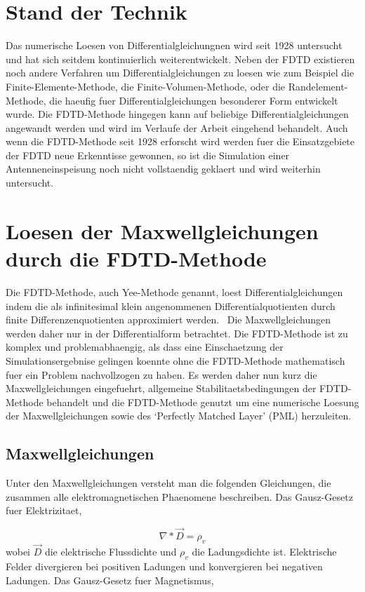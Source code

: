 \documentclass[11pt, ngerman]{article}
\begin{document}
\section{Stand der Technik}
Das numerische Loesen von Differentialgleichungnen wird seit 1928 untersucht
\cite{fdtd_u} und hat sich seitdem kontinuierlich weiterentwickelt.\cite{fdtd_history}
Neben der FDTD existieren noch andere Verfahren um Differentialgleichungen
zu loesen wie zum Beispiel die Finite-Elemente-Methode, die Finite-Volumen-Methode,
oder die Randelement-Methode, die haeufig fuer Differentialgleichungen
besonderer Form entwickelt wurde.\cite{mathepedia_numerische_verfahren} 
Die FDTD-Methode hingegen kann auf beliebige Differentialgleichungen angewandt
werden und wird im Verlaufe der Arbeit eingehend behandelt.
Auch wenn die FDTD-Methode seit 1928 erforscht wird werden fuer die Einsatzgebiete
der FDTD neue Erkenntisse gewonnen, so ist die Simulation einer Antenneneinspeisung
noch nicht vollstaendig geklaert und wird weiterhin untersucht.\cite{advanced_gap_feed}

\section{Loesen der Maxwellgleichungen durch die FDTD-Methode}
Die FDTD-Methode, auch Yee-Methode genannt, loest Differentialgleichungen
indem die als infinitesimal klein angenommenen Differentialquotienten
durch finite Differenzenquotienten approximiert werden.~\cite{fdtd_u}
Die Maxwellgleichungen werden daher nur in der Differentialform betrachtet.
Die FDTD-Methode ist zu komplex und problemabhaengig,
als dass eine Einschaetzung der Simulationsergebnise gelingen koennte ohne die FDTD-Methode
mathematisch fuer ein Problem nachvollzogen zu haben.
Es werden daher nun kurz die Maxwellgleichungen eingefuehrt, allgemeine
Stabilitaetsbedingungen der FDTD-Methode behandelt und die FDTD-Methode
genutzt um eine numerische Loesung der Maxwellgleichungen sowie des
`Perfectly Matched Layer' (PML) herzuleiten.

\subsection{Maxwellgleichungen}
Unter den Maxwellgleichungen versteht man die folgenden Gleichungen, die
zusammen alle elektromagnetischen Phaenomene beschreiben.
Das Gausz-Gesetz fuer Elektrizitaet\cite{gausz_law_electric},

\begin{equation}
	\nabla * \vec{D} = \rho_v
	\label{eq:gausz_law_e}
\end{equation}
wobei \(\vec{D}\) die elektrische Flussdichte und \(\rho_v\) die Ladungsdichte ist.
Elektrische Felder divergieren bei positiven Ladungen und konvergieren bei negativen
Ladungen. Das Gausz-Gesetz fuer Magnetismus\cite{gausz_law_magnetic},
\end{document}
